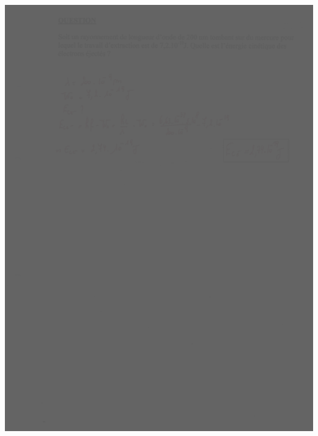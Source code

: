{{{\includegraphics[width=17.498cm,height=24.13cm]{Pictures/10000001000002570000033B2EDAF7105EA9C179.png}

}}}
